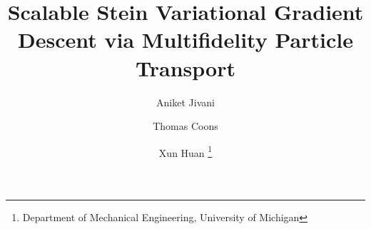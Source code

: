 

\usepackage{lipsum}
\usepackage{amsfonts}
\usepackage{graphicx}
\usepackage{epstopdf}
\usepackage{algorithmic}
\ifpdf
\else
\fi

\usepackage{enumitem}

\newcommand{\creflastconjunction}{, and~}




\title{Scalable Stein Variational Gradient Descent via Multifidelity Particle Transport}

\author{Aniket Jivani 
\and Thomas Coons \footnotemark[2]
\and Xun Huan \footnotemark[2] \footnote{Department of Mechanical Engineering, University of Michigan}}

\usepackage{amsopn}
\DeclareMathOperator{\diag}{diag}


\makeatletter
\newcommand*{\addFileDependency}[1]{%
  \typeout{(#1)}%
  \@addtofilelist{#1}%
  \IfFileExists{#1}{}{\typeout{No file #1.}}%
}
\makeatother

\newcommand*{\myexternaldocument}[1]{%
    \addFileDependency{#1.tex}%
    \addFileDependency{#1.aux}%
}

